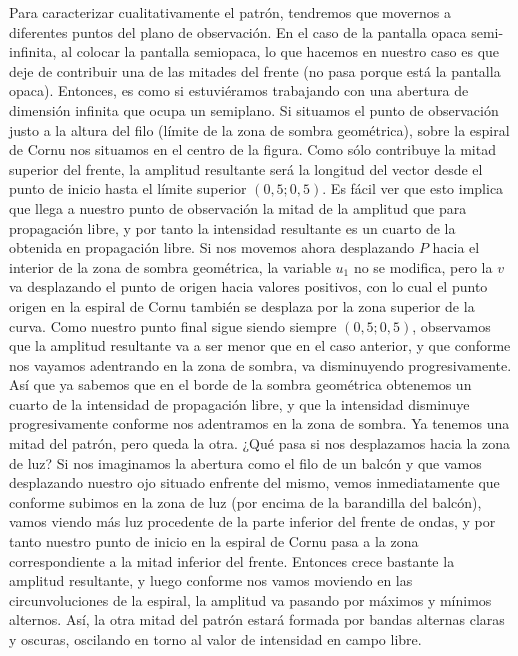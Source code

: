 \documentclass[12pt,a4paper]{report}
\newcommand{\esp}{\vspace{0.5cm}}
\begin{document}
	\esp
	
	Para caracterizar cualitativamente el patrón, tendremos que movernos a diferentes puntos del plano de observación. En el caso de la pantalla opaca semi-infinita, al colocar la pantalla semiopaca, lo que hacemos en nuestro caso es que deje de contribuir una de las mitades del frente (no pasa porque está la pantalla opaca). Entonces, es como si estuviéramos trabajando con una abertura de dimensión infinita que ocupa un semiplano. Si situamos el punto de observación justo a la altura del filo (límite de la zona de sombra geométrica), sobre la espiral de Cornu nos situamos en el centro de la figura. Como sólo contribuye la mitad superior del frente, la amplitud resultante será la longitud del vector desde el punto de inicio hasta el límite superior $(0,5; 0,5)$. Es fácil ver que esto implica que llega a nuestro punto de observación la mitad de la amplitud que para propagación libre, y por tanto la intensidad resultante es un cuarto de la obtenida en propagación libre. Si nos movemos ahora desplazando $P$ hacia el interior de la zona de sombra geométrica, la variable $u_1$ no se modifica, pero la $v$ va desplazando el punto de origen hacia valores positivos, con lo cual el punto origen en la espiral de Cornu también se desplaza por la zona superior de la curva. Como nuestro punto final sigue siendo siempre $(0,5; 0,5)$, observamos que la amplitud resultante va a ser menor que en el caso anterior, y que conforme nos vayamos adentrando en la zona de sombra, va disminuyendo progresivamente. Así que ya sabemos que en el borde de la sombra geométrica obtenemos un cuarto de la intensidad de propagación libre, y que la intensidad disminuye progresivamente conforme nos adentramos en la zona de sombra. Ya tenemos una mitad del patrón, pero queda la otra. ¿Qué pasa si nos desplazamos hacia la zona de luz? Si nos imaginamos la abertura como el filo de un balcón y que vamos desplazando nuestro ojo situado enfrente del mismo, vemos inmediatamente que conforme subimos en la zona de luz (por encima de la barandilla del balcón), vamos viendo más luz procedente de la parte inferior del frente de ondas, y por tanto nuestro punto de inicio en la espiral de Cornu pasa a la zona correspondiente a la mitad inferior del frente. Entonces crece bastante la amplitud resultante, y luego conforme nos vamos moviendo en las circunvoluciones de la espiral, la amplitud va pasando por máximos y mínimos alternos. Así, la otra mitad del patrón estará formada por bandas alternas claras y oscuras, oscilando en torno al valor de intensidad en campo libre.
	
\end{document}
